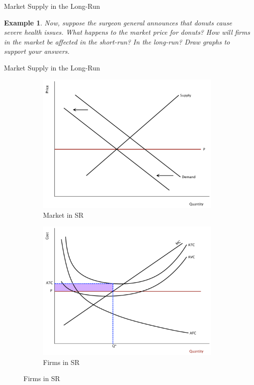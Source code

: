 \documentclass[xcolor={dvipsnames},pdf, hyperref={colorlinks=true, citecolor=ForestGreen, linkcolor=BlueViolet, urlcolor=Magenta}, handout]{beamer}
\newtheorem{exmp}{Example}[section]
\begin{document}
\begin{frame}{Market Supply in the Long-Run}
\begin{exmp}
	Now, suppose the surgeon general announces that donuts cause severe health issues. What happens to the market price for donuts? How will firms in the market be affected in the short-run? In the long-run? Draw graphs to support your answers.
\end{exmp} 
\end{frame}



\begin{frame}{Market Supply in the Long-Run}
\begin{figure}
	\begin{subfigure}{0.35\textwidth}
		\centering
	\includegraphics[scale=.2]{plot70.pdf}
		\caption{Market in SR}
	\end{subfigure}
	\begin{subfigure}{0.35\textwidth}
		\centering
		\includegraphics[scale=.2]{plot71.pdf}
		\caption{ Firms in SR}
	\end{subfigure}
\end{figure}

\end{frame}
\end{document}
